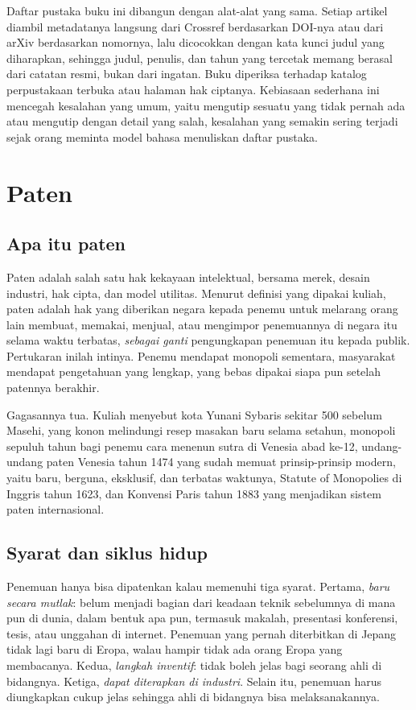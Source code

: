 Daftar pustaka buku ini dibangun dengan alat-alat yang sama. Setiap artikel diambil metadatanya langsung dari Crossref berdasarkan
DOI-nya atau dari arXiv berdasarkan nomornya, lalu dicocokkan dengan kata kunci judul yang diharapkan, sehingga judul, penulis, dan
tahun yang tercetak memang berasal dari catatan resmi, bukan dari ingatan. Buku diperiksa terhadap katalog perpustakaan terbuka atau
halaman hak ciptanya. Kebiasaan sederhana ini mencegah kesalahan yang umum, yaitu mengutip sesuatu yang tidak pernah ada atau
mengutip dengan detail yang salah, kesalahan yang semakin sering terjadi sejak orang meminta model bahasa menuliskan daftar pustaka.

\section{Paten}

\subsection{Apa itu paten}

Paten adalah salah satu hak kekayaan intelektual, bersama merek, desain industri, hak cipta, dan model utilitas. Menurut definisi
yang dipakai kuliah, paten adalah hak yang diberikan negara kepada penemu untuk melarang orang lain membuat, memakai, menjual, atau
mengimpor penemuannya di negara itu selama waktu terbatas, \emph{sebagai ganti} pengungkapan penemuan itu kepada publik. Pertukaran
inilah intinya. Penemu mendapat monopoli sementara, masyarakat mendapat pengetahuan yang lengkap, yang bebas dipakai siapa pun setelah
patennya berakhir.

Gagasannya tua. Kuliah menyebut kota Yunani Sybaris sekitar 500 sebelum Masehi, yang konon melindungi resep masakan baru selama
setahun, monopoli sepuluh tahun bagi penemu cara menenun sutra di Venesia abad ke-12, undang-undang paten Venesia tahun 1474 yang sudah
memuat prinsip-prinsip modern, yaitu baru, berguna, eksklusif, dan terbatas waktunya, Statute of Monopolies di Inggris tahun 1623, dan
Konvensi Paris tahun 1883 yang menjadikan sistem paten internasional.

\subsection{Syarat dan siklus hidup}

Penemuan hanya bisa dipatenkan kalau memenuhi tiga syarat. Pertama, \emph{baru secara mutlak}: belum menjadi bagian dari keadaan
teknik sebelumnya di mana pun di dunia, dalam bentuk apa pun, termasuk makalah, presentasi konferensi, tesis, atau unggahan di
internet. Penemuan yang pernah diterbitkan di Jepang tidak lagi baru di Eropa, walau hampir tidak ada orang Eropa yang membacanya.
Kedua, \emph{langkah inventif}: tidak boleh jelas bagi seorang ahli di bidangnya. Ketiga, \emph{dapat diterapkan di industri}. Selain
itu, penemuan harus diungkapkan cukup jelas sehingga ahli di bidangnya bisa melaksanakannya.

